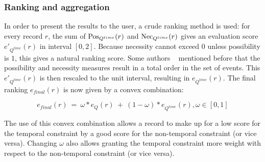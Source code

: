 \vspace{-5pt}

\subsubsection{Ranking and aggregation}
In order to present the results to the user, a crude ranking method is used: for every record $r$, the sum of $\operatorname{Pos}_{Q^{time}}(r)$ and $\operatorname{Nec}_{Q^{time}}(r)$ gives an evaluation score $e'_{Q^{time}}(r)$ in interval $\left[0,2\right]$. Because necessity cannot exceed $0$ unless possibility is $1$, this gives a natural ranking score. Some authors ~\cite{Bosc2010a} mentioned before that the possibility and necessity measures result in a total order in the set of events.  This $e'_{Q^{time}}(r)$ is then rescaled to the unit interval, resulting in $e_{Q^{time}}(r)$. The final ranking $e_{final}(r)$ is now given by a convex combination:


\begin{equation}
\label{eq:convex-comb}
e_{final}(r)\ =\ \omega*e_{Q}(r)\ +\ (1-\omega)*e_{Q^{time}}(r), \omega \in \left[0, 1 \right]
\end{equation}

The use of this convex combination allows a record to make up for a low score for the temporal constraint by a good score for the non-temporal constraint (or vice versa). Changing $\omega$ also allows granting the temporal constraint more weight with respect to the non-temporal constraint (or vice versa).



